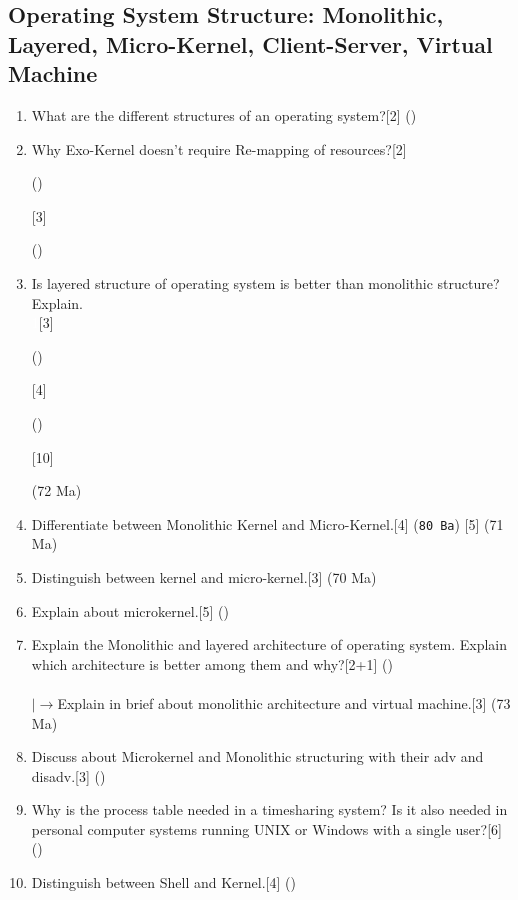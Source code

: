 \documentclass[12pt]{article}
\newcommand{\lb}{\\$\left|\rightarrow\right.$}
\newcommand{\enter}{\\\textcolor{white}{1}}
\begin{document}
	\subsection{Operating System Structure: Monolithic, Layered, Micro-Kernel, Client-Server, Virtual Machine}
	\begin{enumerate}
	\item What are the different structures of an operating system?\hfill[2] ()
	\item Why Exo-Kernel doesn't require Re-mapping of resources?\hfill[2] \begin{small}()\end{small} [3] \begin{small}()\end{small}
	\item Is layered structure of operating system is better than monolithic structure? Explain.
	\enter \hfill[3] \begin{small}()\end{small} [4] \begin{small}()\end{small} [10] \begin{small}(72 Ma)\end{small}
	\item Differentiate between Monolithic Kernel and Micro-Kernel.\hfill[4] (\texttt{80 Ba}) [5] (71 Ma)
	\item Distinguish between kernel and micro-kernel.\hfill[3] (70 Ma)
	\item Explain about microkernel.\hfill[5] ()
	\item Explain the Monolithic and layered architecture of operating system. Explain which architecture is better among them and why?\hspace{6.7cm}[2+1] ()\\
	\lb Explain in brief about monolithic architecture and virtual machine.\hfill[3] (73 Ma)
	\item Discuss about Microkernel and Monolithic structuring with their adv and disadv.[3] () 
	\item Why is the process table needed in a timesharing system? Is it also needed in personal computer systems running UNIX or Windows with a single user?\hfill[6] ()
	\item Distinguish between Shell and Kernel.\hfill[4] ()
	\end{enumerate}
\end{document}
